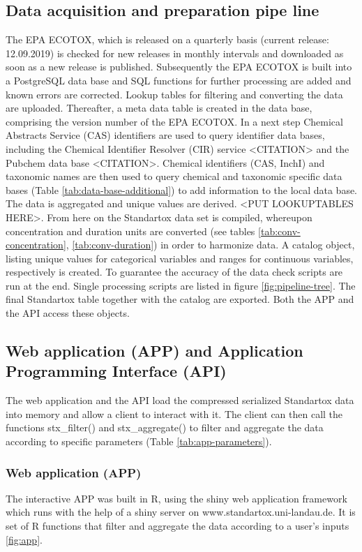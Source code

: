 \subsection*{Data acquisition and preparation pipe line}
The EPA ECOTOX, which is released on a quarterly basis (current release: 12.09.2019) is checked for new releases in monthly intervals and downloaded as soon as a new release is published. Subsequently the EPA ECOTOX is built into a PostgreSQL data base and SQL functions for further processing are added and known errors are corrected. Lookup tables for filtering and converting the data are uploaded. Thereafter, a meta data table is created in the data base, comprising the version number of the EPA ECOTOX. In a next step Chemical Abstracts Service (CAS) identifiers are used to query identifier data bases, including the Chemical Identifier Resolver (CIR) service <CITATION> and the Pubchem data base <CITATION>. Chemical identifiers (CAS, InchI) and taxonomic names are then used to query chemical and taxonomic specific data bases (Table \ref{tab:data-base-additional}) to add information to the local data base. The data is aggregated and unique values are derived. <PUT LOOKUPTABLES HERE>. From here on the Standartox data set is compiled, whereupon concentration and duration units are converted (see tables \ref{tab:conv-concentration}, \ref{tab:conv-duration}) in order to harmonize data. A catalog object, listing unique values for categorical variables and ranges for continuous variables, respectively is created. To guarantee the accuracy of the data check scripts are run at the end. Single processing scripts are listed in figure \ref{fig:pipeline-tree}. The final Standartox table together with the catalog are exported. Both the APP and the API access these objects.

\subsection*{Web application (APP) and Application Programming Interface (API)}

The web application and the API load the compressed serialized Standartox data into memory and allow a client to interact with it. The client can then call the functions stx\_filter() and stx\_aggregate() to filter and aggregate the data according to specific parameters (Table \ref{tab:app-parameters}).

\subsubsection*{Web application (APP)}
The interactive APP was built in R, using the shiny web application framework \citep{chang_shiny_2018} which runs with the help of a shiny server \citep{HOW-TO-CITE-SHINY-SERVER} on www.standartox.uni-landau.de. It is set of R functions that filter and aggregate the data according to a user's inputs \ref{fig:app}. 

